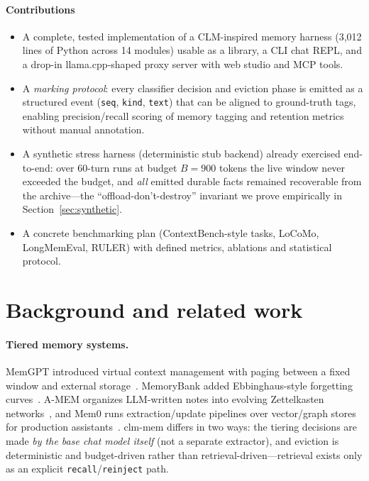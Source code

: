 \documentclass[10pt]{article}
\begin{document}
\paragraph{Contributions}
\begin{itemize}
\item A complete, tested implementation of a CLM-inspired memory harness (3{,}012 lines of Python across 14 modules) usable as a library, a CLI chat REPL, and a drop-in llama.cpp-shaped proxy server with web studio and MCP tools.
\item A \emph{marking protocol}: every classifier decision and eviction phase is emitted as a structured event (\texttt{seq}, \texttt{kind}, \texttt{text}) that can be aligned to ground-truth tags, enabling precision/recall scoring of memory tagging and retention metrics without manual annotation.
\item A synthetic stress harness (deterministic stub backend) already exercised end-to-end: over 60-turn runs at budget $B=900$ tokens the live window never exceeded the budget, and \emph{all} emitted durable facts remained recoverable from the archive---the ``offload-don't-destroy'' invariant we prove empirically in Section~\ref{sec:synthetic}.
\item A concrete benchmarking plan (ContextBench-style tasks, LoCoMo, LongMemEval, RULER) with defined metrics, ablations and statistical protocol.
\end{itemize}

\section{Background and related work}
\paragraph{Tiered memory systems.} MemGPT introduced virtual context management with paging between a fixed window and external storage~\cite{memgpt}. MemoryBank added Ebbinghaus-style forgetting curves~\cite{memorybank}. A-MEM organizes LLM-written notes into evolving Zettelkasten networks~\cite{amem}, and Mem0 runs extraction/update pipelines over vector/graph stores for production assistants~\cite{mem0}. clm-mem differs in two ways: the tiering decisions are made \emph{by the base chat model itself} (not a separate extractor), and eviction is deterministic and budget-driven rather than retrieval-driven---retrieval exists only as an explicit \texttt{recall}/\texttt{reinject} path.
\end{document}
